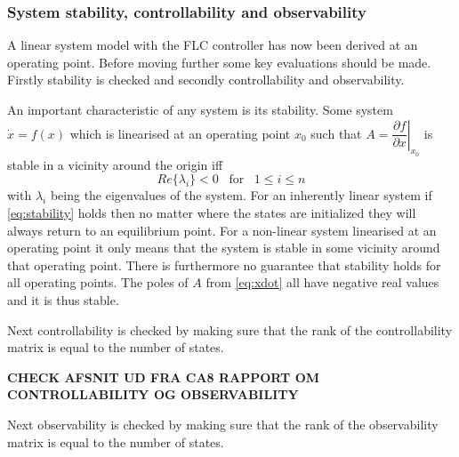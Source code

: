 \subsubsection{System stability, controllability and observability}
A linear system model with the FLC controller has now been derived at an operating point. Before moving further some key evaluations should be made. Firstly stability is checked and secondly controllability and observability.

\medskip
An important characteristic of any system is its stability. Some system $ \dot x = f(x) $ which is linearised at an operating point $ x_0 $ such that $ A = \left. \dfrac{\partial f}{\partial x} \right| _{x_0} $ is stable in a vicinity around the origin iff
\begin{equation}\label{eq:stability}
	Re\{\lambda_i\} < 0 \;\;\; \text{for} \;\;\; 1 \leq i \leq n
\end{equation}
with $ \lambda_i $ being the eigenvalues of the system. For an inherently linear system if \cref{eq:stability} holds then no matter where the states are initialized they will always return to an equilibrium point. For a non-linear system linearised at an operating point it only means that the system is stable in some vicinity around that operating point. There is furthermore no guarantee that stability holds for all operating points. The poles of $ A $ from \cref{eq:xdot} all have negative real values and it is thus stable.

\medskip
Next controllability is checked by making sure that the rank of the controllability matrix is equal to the number of states. 

\textbf{CHECK AFSNIT UD FRA CA8 RAPPORT OM CONTROLLABILITY OG OBSERVABILITY}

\medskip
Next observability is checked by making sure that the rank of the observability matrix is equal to the number of states.



